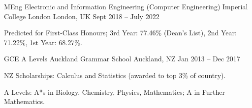

\begin{cventries}

  \cventry
    {MEng Electronic and Information Engineering (Computer Engineering)}
    {Imperial College London}
    {London, UK}
    {Sept 2018 -- July 2022}
    {
      \begin{cvitems}
        \item {Predicted for First-Class Honours; 3rd Year: 77.46\% (Dean's List), 2nd Year: 71.22\%, 1st Year: 68.27\%.}
      \end{cvitems}
    }

  \cventry
    {GCE A Levels}
    {Auckland Grammar School}
    {Auckland, NZ}
    {Jan 2013 -- Dec 2017}
    {
      \begin{cvitems}
        \item NZ Scholarships: Calculus and Statistics (awarded to top 3\% of country).
        \item A Levels: A*s in Biology, Chemistry, Physics, Mathematics; A in Further Mathematics.
      \end{cvitems}
    }


\end{cventries}
